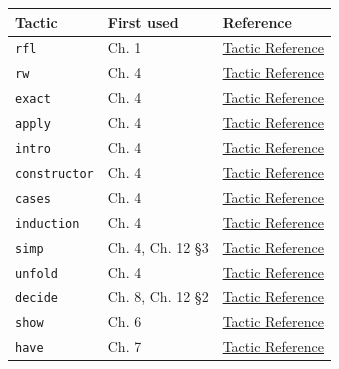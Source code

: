 {\small\begin{tabular}{
  >{\raggedright\arraybackslash}p{}
  >{\raggedright\arraybackslash}p{}
  >{\raggedright\arraybackslash}p{}
}
\toprule
Tactic & First used & Reference \\
\midrule
\texttt{rfl} & Ch. 1 & \href{https://lean-lang.org/doc/reference/latest/Tactic-Proofs/Tactic-Reference/}{Tactic Reference} \\
\texttt{rw} & Ch. 4 & \href{https://lean-lang.org/doc/reference/latest/Tactic-Proofs/Tactic-Reference/}{Tactic Reference} \\
\texttt{exact} & Ch. 4 & \href{https://lean-lang.org/doc/reference/latest/Tactic-Proofs/Tactic-Reference/}{Tactic Reference} \\
\texttt{apply} & Ch. 4 & \href{https://lean-lang.org/doc/reference/latest/Tactic-Proofs/Tactic-Reference/}{Tactic Reference} \\
\texttt{intro} & Ch. 4 & \href{https://lean-lang.org/doc/reference/latest/Tactic-Proofs/Tactic-Reference/}{Tactic Reference} \\
\texttt{constructor} & Ch. 4 & \href{https://lean-lang.org/doc/reference/latest/Tactic-Proofs/Tactic-Reference/}{Tactic Reference} \\
\texttt{cases} & Ch. 4 & \href{https://lean-lang.org/doc/reference/latest/Tactic-Proofs/Tactic-Reference/}{Tactic Reference} \\
\texttt{induction} & Ch. 4 & \href{https://lean-lang.org/doc/reference/latest/Tactic-Proofs/Tactic-Reference/}{Tactic Reference} \\
\texttt{simp} & Ch. 4, Ch. 12 §3 & \href{https://lean-lang.org/doc/reference/latest/Tactic-Proofs/Tactic-Reference/}{Tactic Reference} \\
\texttt{unfold} & Ch. 4 & \href{https://lean-lang.org/doc/reference/latest/Tactic-Proofs/Tactic-Reference/}{Tactic Reference} \\
\texttt{decide} & Ch. 8, Ch. 12 §2 & \href{https://lean-lang.org/doc/reference/latest/Tactic-Proofs/Tactic-Reference/}{Tactic Reference} \\
\texttt{show} & Ch. 6 & \href{https://lean-lang.org/doc/reference/latest/Tactic-Proofs/Tactic-Reference/}{Tactic Reference} \\
\texttt{have} & Ch. 7 & \href{https://lean-lang.org/doc/reference/latest/Tactic-Proofs/Tactic-Reference/}{Tactic Reference} \\

\end{tabular}}
